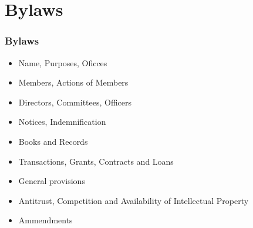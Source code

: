 \section{Bylaws}

\begin{frame}[allowframebreaks]
\frametitle{Bylaws}

\begin{itemize}
  \item Name, Purposes, Oficces
  \item Members, Actions of Members
  \item Directors, Committees, Officers
  \item Notices, Indemnification
  \item Books and Records
  \item Transactions, Grants, Contracts and Loans
  \item General provisions
  \item Antitrust, Competition and Availability of Intellectual Property
  \item Ammendments
\end{itemize}

\end{frame}
